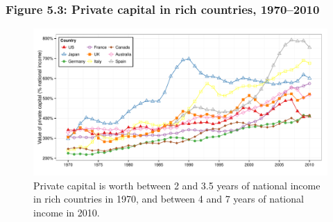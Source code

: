 \documentclass[t]{beamer}\usepackage[]{graphicx}\usepackage[]{color}
\newenvironment{knitrout}{}{} %
\begin{document}
\begin{frame}[label=Figure_5_3]
\frametitle{Figure 5.3: Private capital in rich countries, 1970--2010}
\begin{figure}[t]
\begin{minipage}[b]{\textwidth}
\centering
\begin{knitrout}\footnotesize
{}\color{fgcolor}

{\centering \includegraphics[width=1\linewidth]{figures/color/Figure_5_3} 

}



\end{knitrout}
\caption{Private capital is worth between 2 and 3.5 years of national income in rich countries in 1970, and between 4 and 7 years of national income in 2010.}
\end{minipage}
\end{figure}
\end{frame}
\end{document}
